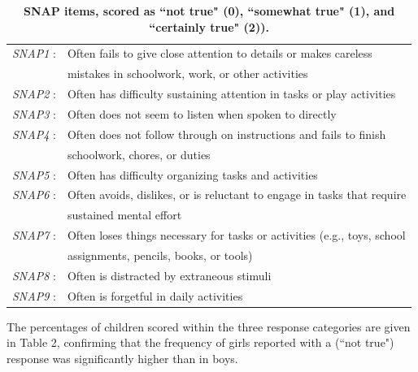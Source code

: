 \documentclass[10pt,letterpaper]{article}
\begin{document}
\begin{table}[!ht]
\begin{adjustwidth}{-5mm}{0in} %
\centering
\caption{\bf SNAP items, scored as ``not true" (0), ``somewhat true" (1), and ``certainly true" (2)).}
\vspace{5mm}
\begin{tabular}{|ll|}
\hline
{\it SNAP1} : & Often fails to give close attention to details or makes careless\\ & mistakes in schoolwork, work, or other activities\\ \hline
{\it SNAP2} : & Often has difficulty sustaining attention in tasks or play activities \\ \hline
{\it SNAP3} : & Often does not seem to listen when spoken to directly \\ \hline
{\it SNAP4} : & Often does not follow through on instructions and fails to finish\\ &  schoolwork, chores, or duties\\ \hline
{\it SNAP5} : & Often has difficulty organizing tasks and activities \\ \hline
{\it SNAP6} : & Often avoids, dislikes, or is reluctant to engage in tasks that require\\ & sustained mental effort\\ \hline
{\it SNAP7} : & Often loses things necessary for tasks or activities (e.g., toys, school\\ &  assignments, pencils, books, or tools) \\ \hline
{\it SNAP8} : & Often is distracted by extraneous stimuli\\ \hline
{\it SNAP9} : & Often is forgetful in daily activities \\ \hline
\end{tabular}
\label{Table1}
\end{adjustwidth}
\end{table}



The percentages of children scored within the three response categories are given in Table 2, confirming that the  frequency of girls reported with a (``not true") response was significantly higher than in boys. \\

\vspace{5mm}
\end{document}

